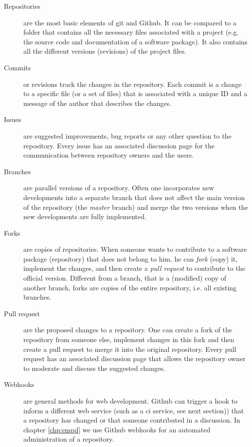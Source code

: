 \begin{refsection}
\begin{description}
	\item[Repositories] are the most basic elements of git and Github. It can be compared to a folder that contains all the necessary files associated with a project (e.g. the source code and documentation of a software package). It also contains all the different versions (revisions) of the project files.
	\item[Commits] or revisions track the changes in the repository. Each commit is a change to a specific file (or a set of files) that is associated with a unique ID and a message of the author that describes the changes.
	\item[Issues] are suggested improvements, bug reports or any other question to the repository. Every issue has an associated discussion page for the communication between repository owners and the users.
	\item[Branches] are parallel versions of a repository. Often one incorporates new developments into a separate branch that does not affect the main version of the repository (the \textit{master} branch) and merge the two versions when the new developments are fully implemented.
	\item[Forks] are copies of repositories. When someone wants to contribute to a software package (repository) that does not belong to him, he can \textit{fork} (copy) it, implement the changes, and then create a \textit{pull request} to contribute to the official version. Different from a branch, that is a (modified) copy of another branch, forks are copies of the entire repository, i.e. all existing branches.
	\item[Pull request] are the proposed changes to a repository. One can create a fork of the repository from someone else, implement changes in this fork and then create a pull request to merge it into the original repository. Every pull request has an associated discussion page that allows the repository owner to moderate and discuss the suggested changes.
	\item[Webhooks] are general methods for web development. Github can trigger a hook to inform a different web service (such as a \gls{ci} service, see next section)) that a repository has changed or that someone contributed in a discussion. In chapter \ref{chp:empd} we use Github webhooks for an automated administration of a repository.
\end{description}



\end{refsection}
